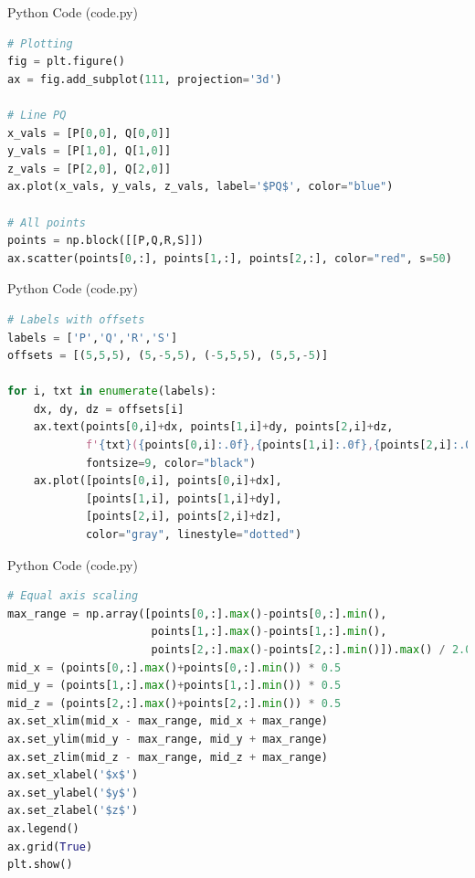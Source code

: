 \documentclass{beamer}
\begin{document}
\begin{frame}[fragile]{Python Code (code.py)}
\begin{lstlisting}[language=Python]
# Plotting
fig = plt.figure()
ax = fig.add_subplot(111, projection='3d')

# Line PQ
x_vals = [P[0,0], Q[0,0]]
y_vals = [P[1,0], Q[1,0]]
z_vals = [P[2,0], Q[2,0]]
ax.plot(x_vals, y_vals, z_vals, label='$PQ$', color="blue")

# All points
points = np.block([[P,Q,R,S]])
ax.scatter(points[0,:], points[1,:], points[2,:], color="red", s=50)
\end{lstlisting}
\end{frame}
\begin{frame}[fragile]{Python Code (code.py)}
\begin{lstlisting}[language=Python]
# Labels with offsets
labels = ['P','Q','R','S']
offsets = [(5,5,5), (5,-5,5), (-5,5,5), (5,5,-5)]

for i, txt in enumerate(labels):
    dx, dy, dz = offsets[i]
    ax.text(points[0,i]+dx, points[1,i]+dy, points[2,i]+dz,
            f'{txt}({points[0,i]:.0f},{points[1,i]:.0f},{points[2,i]:.0f})',
            fontsize=9, color="black")
    ax.plot([points[0,i], points[0,i]+dx],
            [points[1,i], points[1,i]+dy],
            [points[2,i], points[2,i]+dz],
            color="gray", linestyle="dotted")
\end{lstlisting}
\end{frame}
\begin{frame}[fragile]{Python Code (code.py)}
\begin{lstlisting}[language=Python]
# Equal axis scaling
max_range = np.array([points[0,:].max()-points[0,:].min(),
                      points[1,:].max()-points[1,:].min(),
                      points[2,:].max()-points[2,:].min()]).max() / 2.0
mid_x = (points[0,:].max()+points[0,:].min()) * 0.5
mid_y = (points[1,:].max()+points[1,:].min()) * 0.5
mid_z = (points[2,:].max()+points[2,:].min()) * 0.5
ax.set_xlim(mid_x - max_range, mid_x + max_range)
ax.set_ylim(mid_y - max_range, mid_y + max_range)
ax.set_zlim(mid_z - max_range, mid_z + max_range)
ax.set_xlabel('$x$')
ax.set_ylabel('$y$')
ax.set_zlabel('$z$')
ax.legend()
ax.grid(True)
plt.show()
\end{lstlisting}
\end{frame}
\end{document}
